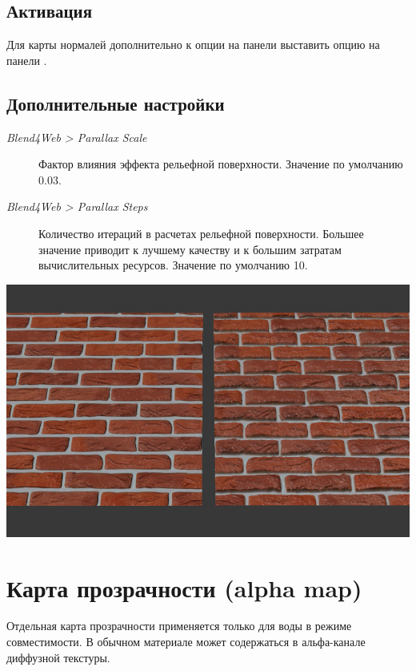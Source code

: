 \documentclass[a4paper,12pt,oneside]{sphinxmanual}
\begin{document}
\subsection{Активация}
\label{textures:id10}
Для карты нормалей дополнительно к опции  на панели  выставить опцию  на панели .


\subsection{Дополнительные настройки}
\label{textures:id11}\begin{description}
\item[{\emph{Blend4Web \textgreater{} Parallax Scale}}] \leavevmode
Фактор влияния эффекта рельефной поверхности. Значение по умолчанию 0.03.

\item[{\emph{Blend4Web \textgreater{} Parallax Steps}}] \leavevmode
Количество итераций в расчетах рельефной поверхности. Большее значение приводит к лучшему качеству и к большим затратам вычислительных ресурсов. Значение по умолчанию 10.

\end{description}

{\hfill\includegraphics[width=1.000\linewidth]{parallax.jpg}\hfill}

\begin{DUlineblock}{0em}
\item[] 
\end{DUlineblock}


\section{Карта прозрачности (alpha map)}
\label{textures:alpha-map}\label{textures:texture-alpha-map}\label{textures:index-8}
Отдельная карта прозрачности применяется только для воды в режиме совместимости. В обычном материале может содержаться в альфа-канале диффузной текстуры.
\end{document}
